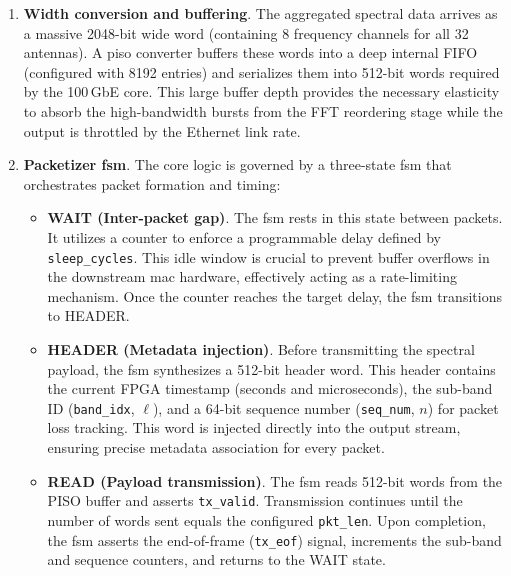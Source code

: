 \begin{enumerate}

	\item \textbf{Width conversion and buffering}.  
	The aggregated spectral data arrives as a massive 2048-bit wide word (containing 8 frequency channels for all 32 antennas). A \gls{piso} converter buffers these words into a deep internal FIFO (configured with 8192 entries) and serializes them into 512-bit words required by the 100\,GbE core. This large buffer depth provides the necessary elasticity to absorb the high-bandwidth bursts from the FFT reordering stage while the output is throttled by the Ethernet link rate.

	\item \textbf{Packetizer \gls{fsm}}.  
	The core logic is governed by a three-state \gls{fsm} that orchestrates packet formation and timing:

	\begin{itemize}
		\item \textbf{WAIT (Inter-packet gap)}.  
		The \gls{fsm} rests in this state between packets. It utilizes a counter to enforce a programmable delay defined by \texttt{sleep\_cycles}. This idle window is crucial to prevent buffer overflows in the downstream \gls{mac} hardware, effectively acting as a rate-limiting mechanism. Once the counter reaches the target delay, the \gls{fsm} transitions to HEADER.

		\item \textbf{HEADER (Metadata injection)}.  
		Before transmitting the spectral payload, the \gls{fsm} synthesizes a 512-bit header word. This header contains the current FPGA timestamp (seconds and microseconds), the sub-band ID (\texttt{band\_idx}, $\ell$), and a 64-bit sequence number (\texttt{seq\_num}, $n$) for packet loss tracking. This word is injected directly into the output stream, ensuring precise metadata association for every packet.

		\item \textbf{READ (Payload transmission)}.  
		The \gls{fsm} reads 512-bit words from the PISO buffer and asserts \texttt{tx\_valid}. Transmission continues until the number of words sent equals the configured \texttt{pkt\_len}. Upon completion, the \gls{fsm} asserts the end-of-frame (\texttt{tx\_eof}) signal, increments the sub-band and sequence counters, and returns to the WAIT state.
	\end{itemize}

\end{enumerate}

